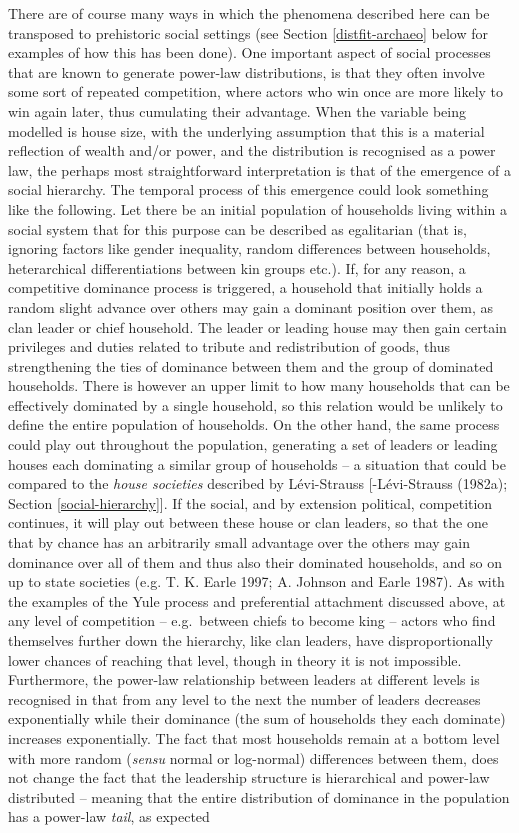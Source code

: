 \documentclass[
  12pt,
  a4paper, twoside]{book}
\begin{document}
There are of course many ways in which the phenomena described here can be transposed to prehistoric social settings (see Section \ref{distfit-archaeo} below for examples of how this has been done). One important aspect of social processes that are known to generate power-law distributions, is that they often involve some sort of repeated competition, where actors who win once are more likely to win again later, thus cumulating their advantage. When the variable being modelled is house size, with the underlying assumption that this is a material reflection of wealth and/or power, and the distribution is recognised as a power law, the perhaps most straightforward interpretation is that of the emergence of a social hierarchy. The temporal process of this emergence could look something like the following. Let there be an initial population of households living within a social system that for this purpose can be described as egalitarian (that is, ignoring factors like gender inequality, random differences between households, heterarchical differentiations between kin groups etc.). If, for any reason, a competitive dominance process is triggered, a household that initially holds a random slight advance over others may gain a dominant position over them, as clan leader or chief household. The leader or leading house may then gain certain privileges and duties related to tribute and redistribution of goods, thus strengthening the ties of dominance between them and the group of dominated households. There is however an upper limit to how many households that can be effectively dominated by a single household, so this relation would be unlikely to define the entire population of households. On the other hand, the same process could play out throughout the population, generating a set of leaders or leading houses each dominating a similar group of households -- a situation that could be compared to the \emph{house societies} described by Lévi-Strauss {[}-Lévi-Strauss (1982a); Section \ref{social-hierarchy}{]}. If the social, and by extension political, competition continues, it will play out between these house or clan leaders, so that the one that by chance has an arbitrarily small advantage over the others may gain dominance over all of them and thus also their dominated households, and so on up to state societies (e.g. T. K. Earle 1997; A. Johnson and Earle 1987). As with the examples of the Yule process and preferential attachment discussed above, at any level of competition -- e.g.~between chiefs to become king -- actors who find themselves further down the hierarchy, like clan leaders, have disproportionally lower chances of reaching that level, though in theory it is not impossible. Furthermore, the power-law relationship between leaders at different levels is recognised in that from any level to the next the number of leaders decreases exponentially while their dominance (the sum of households they each dominate) increases exponentially. The fact that most households remain at a bottom level with more random (\emph{sensu} normal or log-normal) differences between them, does not change the fact that the leadership structure is hierarchical and power-law distributed -- meaning that the entire distribution of dominance in the population has a power-law \emph{tail}, as expected 
\end{document}
